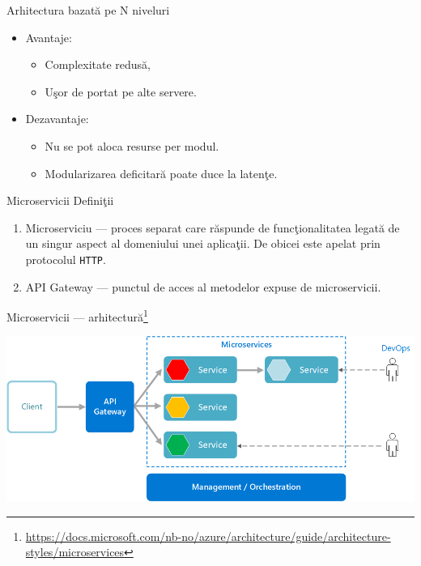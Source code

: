 \documentclass[presentation]{beamer}
\begin{document}
\begin{frame}[label={sec:org2b14490}]{Arhitectura bazată pe N niveluri}
\begin{itemize}
\item Avantaje:
\begin{itemize}
\item Complexitate redusă,
\item Uşor de portat pe alte servere.
\end{itemize}
\item Dezavantaje:
\begin{itemize}
\item Nu se pot aloca resurse per modul.
\item Modularizarea deficitară poate duce la latenţe.
\end{itemize}
\end{itemize}
\end{frame}
\begin{frame}[label={sec:org0a16201},fragile]{Microservicii}
 Definiţii
\begin{enumerate}
\item \alert{Microserviciu} --- proces separat care răspunde de funcţionalitatea legată de un singur aspect al domeniului unei aplicaţii. De obicei este apelat prin protocolul \texttt{HTTP}.
\item \alert{API Gateway} --- punctul de acces al metodelor expuse de microservicii.
\end{enumerate}
\end{frame}
\begin{frame}[label={sec:orga087467}]{Microservicii --- arhitectură\footnote{\url{https://docs.microsoft.com/nb-no/azure/architecture/guide/architecture-styles/microservices}}}
\begin{center}
\includegraphics[width=.9\linewidth]{img/microservices-logical.png}
\end{center}
\end{frame}
\end{document}

